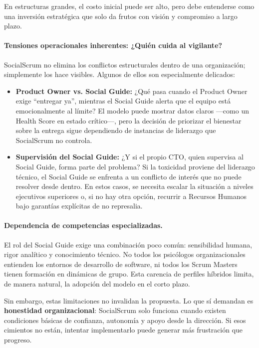En estructuras grandes, el costo inicial puede ser alto, pero debe entenderse como una inversión estratégica que solo da frutos con visión y compromiso a largo plazo.

\paragraph{Tensiones operacionales inherentes: ¿Quién cuida al vigilante?}
SocialScrum no elimina los conflictos estructurales dentro de una organización; simplemente los hace visibles. Algunos de ellos son especialmente delicados:

\begin{itemize}
    \item \textbf{Product Owner vs. Social Guide:} ¿Qué pasa cuando el Product Owner exige ``entregar ya'', mientras el Social Guide alerta que el equipo está emocionalmente al límite? El modelo puede mostrar datos claros —como un Health Score en estado crítico—, pero la decisión de priorizar el bienestar sobre la entrega sigue dependiendo de instancias de liderazgo que SocialScrum no controla.
    \item \textbf{Supervisión del Social Guide:} ¿Y si el propio CTO, quien supervisa al Social Guide, forma parte del problema? Si la toxicidad proviene del liderazgo técnico, el Social Guide se enfrenta a un conflicto de interés que no puede resolver desde dentro. En estos casos, se necesita escalar la situación a niveles ejecutivos superiores o, si no hay otra opción, recurrir a Recursos Humanos bajo garantías explícitas de no represalia.
\end{itemize}

\paragraph{Dependencia de competencias especializadas.}
El rol del Social Guide exige una combinación poco común: sensibilidad humana, rigor analítico y conocimiento técnico. No todos los psicólogos organizacionales entienden los entornos de desarrollo de software, ni todos los Scrum Masters tienen formación en dinámicas de grupo. Esta carencia de perfiles híbridos limita, de manera natural, la adopción del modelo en el corto plazo.

Sin embargo, estas limitaciones no invalidan la propuesta. Lo que sí demandan es \textbf{honestidad organizacional}: SocialScrum solo funciona cuando existen condiciones básicas de confianza, autonomía y apoyo desde la dirección. Si esos cimientos no están, intentar implementarlo puede generar más frustración que progreso.

